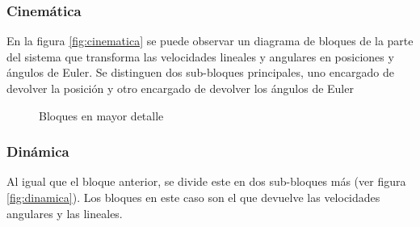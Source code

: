 \documentclass[main]{subfiles}
\begin{document}
\subsubsection{Cinem\'atica}

En la figura \ref{fig:cinematica} se puede observar un diagrama de bloques de la parte del sistema que transforma las velocidades lineales y angulares en posiciones y ángulos de Euler. Se distinguen dos sub-bloques principales, uno encargado de devolver la  posici\'on y otro encargado de devolver los \'angulos de Euler
\begin{figure} [h!]
  \centering
  \caption{Bloques en mayor detalle}
  \label{fig:bloques}
\end{figure}



\subsubsection{Din\'amica}

Al igual que el bloque anterior, se divide este en dos sub-bloques m\'as (ver figura \ref{fig:dinamica}). Los bloques en este caso son el que devuelve las velocidades angulares y las lineales. 
\end{document}
